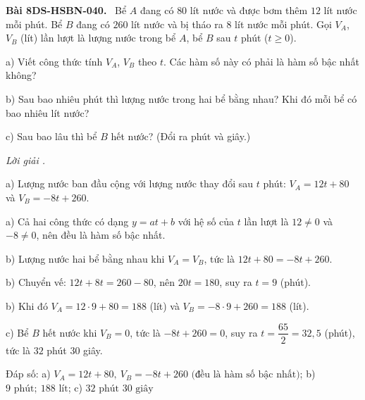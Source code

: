 \documentclass[12pt,a4paper]{article}
\newenvironment{problem}[1][]{\par\medskip\noindent\textbf{Bài #1.}\ }{\par}
\newenvironment{solution}[1][]{\par\noindent\textit{Lời giải #1.}\par}{\par}
\begin{document}
\begin{problem}[8DS-HSBN-040]
Bể $A$ đang có $80$ lít nước và được bơm thêm $12$ lít nước mỗi phút. Bể $B$ đang có $260$ lít nước và bị tháo ra $8$ lít nước mỗi phút. Gọi $V_A$, $V_B$ (lít) lần lượt là lượng nước trong bể $A$, bể $B$ sau $t$ phút ($t \geq 0$).

a) Viết công thức tính $V_A$, $V_B$ theo $t$. Các hàm số này có phải là hàm số bậc nhất không?

b) Sau bao nhiêu phút thì lượng nước trong hai bể bằng nhau? Khi đó mỗi bể có bao nhiêu lít nước?

c) Sau bao lâu thì bể $B$ hết nước? (Đổi ra phút và giây.)

\begin{solution}
a) Lượng nước ban đầu cộng với lượng nước thay đổi sau $t$ phút: $V_A = 12t + 80$ và $V_B = -8t + 260$.

a) Cả hai công thức có dạng $y = at + b$ với hệ số của $t$ lần lượt là $12 \neq 0$ và $-8 \neq 0$, nên đều là hàm số bậc nhất.

b) Lượng nước hai bể bằng nhau khi $V_A = V_B$, tức là $12t + 80 = -8t + 260$.

b) Chuyển vế: $12t + 8t = 260 - 80$, nên $20t = 180$, suy ra $t = 9$ (phút).

b) Khi đó $V_A = 12 \cdot 9 + 80 = 188$ (lít) và $V_B = -8 \cdot 9 + 260 = 188$ (lít).

c) Bể $B$ hết nước khi $V_B = 0$, tức là $-8t + 260 = 0$, suy ra $t = \dfrac{65}{2} = 32{,}5$ (phút), tức là $32$ phút $30$ giây.

Đáp số: a) $\boxed{V_A = 12t + 80,\ V_B = -8t + 260 \text{ (đều là hàm số bậc nhất)}}$; b) $\boxed{9 \text{ phút};\ 188 \text{ lít}}$; c) $\boxed{32 \text{ phút } 30 \text{ giây}}$
\end{solution}
\end{problem}
\end{document}
